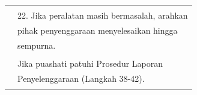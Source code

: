 \documentclass[
]{article}
\begin{document}
\begin{longtable}[]{@{}ll@{}}
\begin{minipage}[t]{0.23\columnwidth}\raggedright
\strut
\end{minipage} & \begin{minipage}[t]{0.71\columnwidth}\raggedright
\strut
\end{minipage}\tabularnewline
\begin{minipage}[t]{0.23\columnwidth}\raggedright
\strut
\end{minipage} & \begin{minipage}[t]{0.71\columnwidth}\raggedright
22. Jika peralatan masih bermasalah, arahkan\strut
\end{minipage}\tabularnewline
\begin{minipage}[t]{0.23\columnwidth}\raggedright
\strut
\end{minipage} & \begin{minipage}[t]{0.71\columnwidth}\raggedright
pihak penyenggaraan menyelesaikan hingga\strut
\end{minipage}\tabularnewline
\begin{minipage}[t]{0.23\columnwidth}\raggedright
\strut
\end{minipage} & \begin{minipage}[t]{0.71\columnwidth}\raggedright
sempurna.\strut
\end{minipage}\tabularnewline
\begin{minipage}[t]{0.23\columnwidth}\raggedright
\strut
\end{minipage} & \begin{minipage}[t]{0.71\columnwidth}\raggedright
\strut
\end{minipage}\tabularnewline
\begin{minipage}[t]{0.23\columnwidth}\raggedright
\strut
\end{minipage} & \begin{minipage}[t]{0.71\columnwidth}\raggedright
Jika puashati patuhi Prosedur Laporan\strut
\end{minipage}\tabularnewline
\begin{minipage}[t]{0.23\columnwidth}\raggedright
\strut
\end{minipage} & \begin{minipage}[t]{0.71\columnwidth}\raggedright
Penyelenggaraan (Langkah 38-42).\strut
\end{minipage}\tabularnewline
\begin{minipage}[t]{0.23\columnwidth}\raggedright
\strut
\end{minipage} & \begin{minipage}[t]{0.71\columnwidth}\raggedright

\end{minipage}
\end{longtable}
\end{document}
